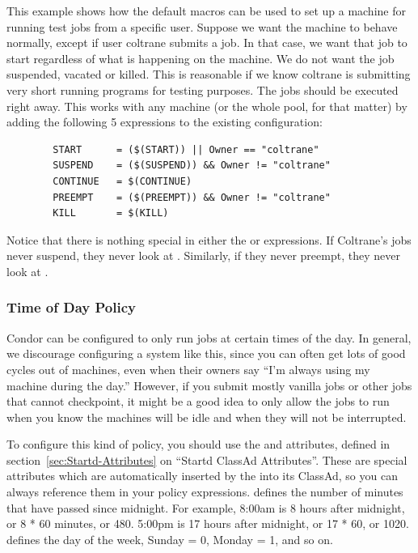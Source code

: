 This example shows how the default macros can be used to
set up a machine for running test jobs from a specific user.
Suppose we want the machine to
behave normally, except if user coltrane submits a job.
In that case, we
want that job to start regardless of what is happening on the machine.
We do not want the job suspended, vacated or killed.
This is reasonable if 
we know coltrane is submitting very short
running programs for testing purposes. 
The jobs should be executed right away.
This works with any machine
(or the whole pool, for that matter) by adding the following 5 expressions
to the existing configuration:
\begin{verbatim}
        START      = ($(START)) || Owner == "coltrane"
        SUSPEND    = ($(SUSPEND)) && Owner != "coltrane"
        CONTINUE   = $(CONTINUE)
        PREEMPT    = ($(PREEMPT)) && Owner != "coltrane"
        KILL       = $(KILL)
\end{verbatim}
Notice that there is nothing special in either the
 or  expressions.
If Coltrane's jobs never suspend, they never look at .  
Similarly, if they never preempt, they never look at . 


\subsubsection{\label{sec:Time of Day Policy}
Time of Day Policy}

Condor can be
configured to only run jobs at
certain times of the day.
In general, we discourage configuring a system like this, since you
can often get lots of good cycles out of machines, even when their
owners say ``I'm always using my machine during the day.''
However, if you submit mostly vanilla jobs or other jobs that cannot
checkpoint, it might be a good idea to only allow the jobs to run when
you know the machines will be idle and when they will not be
interrupted.

To configure this kind of policy, you should use the 
and  attributes, defined in
section~\ref{sec:Startd-Attributes} on ``Startd ClassAd Attributes''.
These are special attributes which are automatically inserted by the
 into its ClassAd, so you can always reference them in
your policy expressions.
 defines the number of minutes that have passed since
midnight.  
For example, 8:00am is 8 hours after midnight, or 8 * 60 minutes, or
480.
5:00pm is 17 hours after midnight, or 17 * 60, or 1020.
 defines the day of the week, Sunday = 0, Monday = 1,
and so on.  

